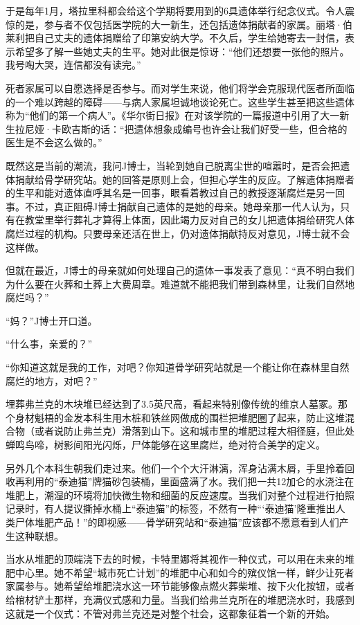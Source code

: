 \documentclass[12pt,oneside]{book}
\begin{document}
\begin{bookref}[frametitle={\cite{好好告别：世界葬礼观察手记}}]
于是每年1月，塔拉里科都会给这个学期将要用到的6具遗体举行纪念仪式。令人震惊的是，参与者不仅包括医学院的大一新生，还包括遗体捐献者的家属。丽塔·伯莱利把自己丈夫的遗体捐赠给了印第安纳大学。不久后，学生给她寄去一封信，表示希望多了解一些她丈夫的生平。她对此很是惊讶：“他们还想要一张他的照片。我号啕大哭，连信都没有读完。”

死者家属可以自愿选择是否参与。而对学生来说，他们将学会克服现代医者所面临的一个难以跨越的障碍——与病人家属坦诚地谈论死亡。这些学生甚至把这些遗体称为“他们的第一个病人”。《华尔街日报》在对该学院的一篇报道中引用了大一新生拉尼娅·卡欧吉斯的话：“把遗体想象成编号也许会让我们好受一些，但合格的医生是不会这么做的。”

既然这是当前的潮流，我问J博士，当轮到她自己脱离尘世的喧嚣时，是否会把遗体捐献给骨学研究站。她的回答是原则上会，但担心学生的反应。了解遗体捐赠者的生平和能对遗体直呼其名是一回事，眼看着教过自己的教授逐渐腐烂是另一回事。不过，真正阻碍J博士捐献自己遗体的是她的母亲。她母亲那一代人认为，只有在教堂里举行葬礼才算得上体面，因此竭力反对自己的女儿把遗体捐给研究人体腐烂过程的机构。只要母亲还活在世上，仍对遗体捐献持反对意见，J博士就不会这样做。

但就在最近，J博士的母亲就如何处理自己的遗体一事发表了意见：“真不明白我们为什么要在火葬和土葬上大费周章。难道就不能把我们带到森林里，让我们自然地腐烂吗？”

“妈？”J博士开口道。

“什么事，亲爱的？”

“你知道这就是我的工作，对吧？你知道骨学研究站就是一个能让你在森林里自然腐烂的地方，对吧？”

埋葬弗兰克的木块堆已经达到了3.5英尺高，看起来特别像传统的维京人墓冢。那个身材魁梧的金发本科生用木桩和铁丝网做成的围栏把堆肥圈了起来，防止这堆混合物（或者说防止弗兰克）滑落到山下。这和城市里的堆肥过程大相径庭，但此处蝉鸣鸟啼，树影间阳光闪烁，尸体能够在这里腐烂，绝对符合美学的定义。

另外几个本科生朝我们走过来。他们一个个大汗淋漓，浑身沾满木屑，手里拎着回收再利用的“泰迪猫”牌猫砂包装桶，里面盛满了水。我们把一共12加仑的水浇注在堆肥上，潮湿的环境将加快微生物和细菌的反应速度。当我们对整个过程进行拍照记录时，有人提议撕掉水桶上“泰迪猫”的标签，不然有一种“‘泰迪猫’隆重推出人类尸体堆肥产品！”的即视感——骨学研究站和“泰迪猫”应该都不愿意看到人们产生这种联想。

当水从堆肥的顶端浇下去的时候，卡特里娜将其视作一种仪式，可以用在未来的堆肥中心里。她不希望“城市死亡计划”的堆肥中心和如今的殡仪馆一样，鲜少让死者家属参与。她希望给堆肥浇水这一环节能够像点燃火葬柴堆、按下火化按钮，或者给棺材铲土那样，充满仪式感和力量。当我们给弗兰克所在的堆肥浇水时，我感到这就是一个仪式：不管对弗兰克还是对整个社会，这都象征着一个新的开始。


\end{bookref}
\end{document}
